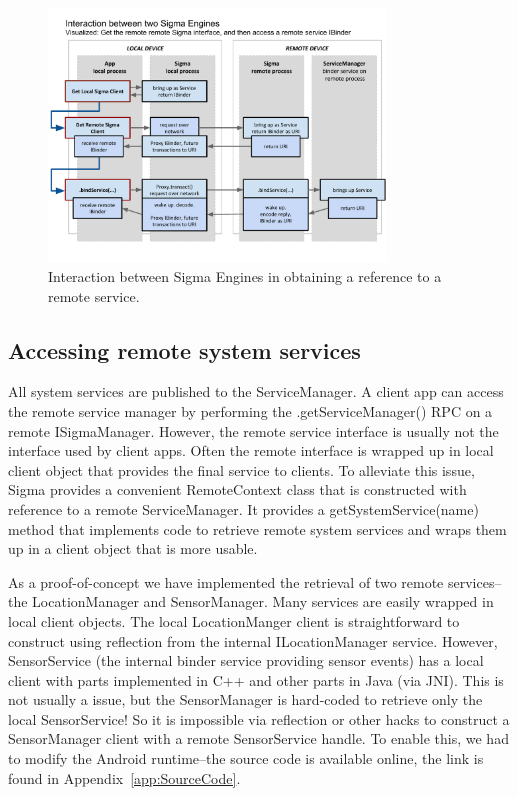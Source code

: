 \documentclass[prodmode]{acmlarge}
\begin{document}
\begin{figure}[h]
\centering
\includegraphics[width=0.8\textwidth]{drawings/SigmaEngineInteraction.pdf}
\caption{Interaction between Sigma Engines in obtaining a reference to a remote service.}
\label{fig:SigmaInteraction}
\end{figure}

\subsection{Accessing remote system services}
All system services are published to the ServiceManager. A client app can access the remote service manager by performing the .getServiceManager() RPC on a remote ISigmaManager. However, the remote service interface is usually not the interface used by client apps. Often the remote interface is wrapped up in local client object that provides the final service to clients. To alleviate this issue, Sigma provides a convenient RemoteContext class that is constructed with reference to a remote ServiceManager. It provides a getSystemService(name) method that implements code to retrieve remote system services and wraps them up in a client object that is more usable.

As a proof-of-concept we have implemented the retrieval of two remote services--the LocationManager and SensorManager. Many services are easily wrapped in local client objects. The local LocationManger client is straightforward to construct using reflection from the internal ILocationManager service. However, SensorService (the internal binder service providing sensor events) has a local client with parts implemented in C++ and other parts in Java (via JNI). This is not usually a issue, but the SensorManager is hard-coded to retrieve only the local SensorService! So it is impossible via reflection or other hacks to construct a SensorManager client with a remote SensorService handle. To enable this, we had to modify the Android runtime--the source code is available online, the link is found in Appendix~\ref{app:SourceCode}.
\end{document}
